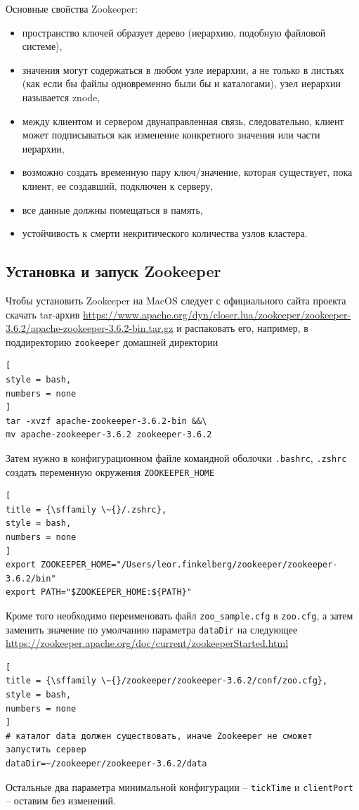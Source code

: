 \documentclass[%
	11pt,
	a4paper,
	utf8,
		]{article}
\begin{document}
Основные свойства Zookeeper:
\begin{itemize}
	\item пространство ключей образует дерево (иерархию, подобную файловой системе),
	
	\item значения могут содержаться в любом узле иерархии, а не только в листьях (как если бы файлы одновременно были бы и каталогами), узел иерархии называется znode,
	
	\item между клиентом и сервером двунаправленная связь, следовательно, клиент может подписываться как изменение конкретного значения или части иерархии,
	
	\item возможно создать временную пару ключ/значение, которая существует, пока клиент, ее создавший, подключен к серверу,
	
	\item все данные должны помещаться в память,
	
	\item устойчивость к смерти некритического количества узлов кластера.
\end{itemize}

\subsection{Установка и запуск Zookeeper}\label{subsec:zookeeper}

Чтобы установить Zookeeper на MacOS следует с официального сайта проекта скачать tar-архив \url{https://www.apache.org/dyn/closer.lua/zookeeper/zookeeper-3.6.2/apache-zookeeper-3.6.2-bin.tar.gz} и распаковать его, например, в поддиректорию \texttt{zookeeper} домашней директории
\begin{lstlisting}[
style = bash,
numbers = none	
]
tar -xvzf apache-zookeeper-3.6.2-bin &&\
mv apache-zookeeper-3.6.2 zookeeper-3.6.2
\end{lstlisting}

Затем нужно в конфигурационном файле командной оболочки \texttt{.bashrc}, \texttt{.zshrc} создать переменную окружения \texttt{ZOOKEEPER\_HOME}
\begin{lstlisting}[
title = {\sffamily \~{}/.zshrc},
style = bash,
numbers = none	
]
export ZOOKEEPER_HOME="/Users/leor.finkelberg/zookeeper/zookeeper-3.6.2/bin"
export PATH="$ZOOKEEPER_HOME:${PATH}"
\end{lstlisting}

Кроме того необходимо переименовать файл \texttt{zoo\_sample.cfg} в \texttt{zoo.cfg}, а затем заменить значение по умолчанию параметра \texttt{dataDir} на следующее \url{https://zookeeper.apache.org/doc/current/zookeeperStarted.html}
\begin{lstlisting}[
title = {\sffamily \~{}/zookeeper/zookeeper-3.6.2/conf/zoo.cfg},
style = bash,
numbers = none	
]
# каталог data должен существовать, иначе Zookeeper не сможет запустить сервер
dataDir=~/zookeeper/zookeeper-3.6.2/data
\end{lstlisting}
Остальные два параметра минимальной конфигурации -- \texttt{tickTime} и \texttt{clientPort} -- оставим без изменений.
\end{document}
